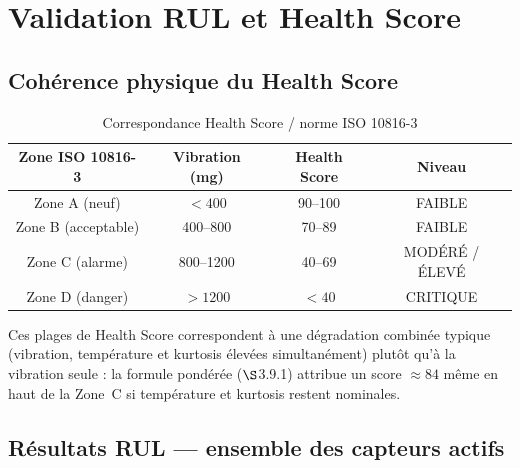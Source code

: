 \documentclass[12pt,a4paper]{report}
\begin{document}
\section{Validation RUL et Health Score}

\subsection{Cohérence physique du Health Score}

\begin{table}[H]
\centering
\caption{Correspondance Health Score / norme ISO 10816-3 \cite{iso10816}}
\begin{tabular}{cccc}
\toprule
\textbf{Zone ISO 10816-3} & \textbf{Vibration (mg)} & \textbf{Health Score} & \textbf{Niveau} \\
\midrule
Zone A (neuf)       & $< 400$  & 90--100 & FAIBLE   \\
Zone B (acceptable) & 400--800 & 70--89  & FAIBLE   \\
Zone C (alarme)     & 800--1200 & 40--69 & MODÉRÉ / ÉLEVÉ \\
Zone D (danger)     & $> 1200$ & $< 40$  & CRITIQUE \\
\bottomrule
\end{tabular}
\end{table}

\noindent Ces plages de Health Score correspondent à une dégradation combinée typique
(vibration, température et kurtosis élevées simultanément) plutôt qu'à la vibration seule :
la formule pondérée ($\S$3.9.1) attribue un score $\approx 84$ même en haut de la Zone~C si
température et kurtosis restent nominales.

\subsection{Résultats RUL — ensemble des capteurs actifs}
\end{document}
